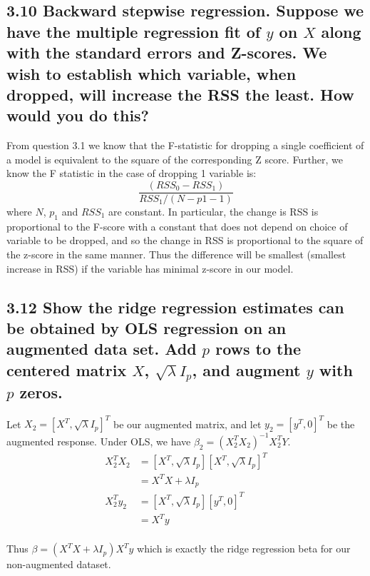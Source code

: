 \subsection*{3.10 Backward stepwise regression. Suppose we have the multiple regression fit of $y$ on $X$ along with the standard errors and Z-scores. We wish to establish which variable, when dropped, will increase the RSS the least. How would you do this?}

From question 3.1 we know that the F-statistic for dropping a single coefficient of a model is equivalent to the square of the corresponding Z score.
Further, we know the F statistic in the case of dropping 1 variable is:
$$ \frac{\left(RSS_0 - RSS_1\right)}{RSS_1 / (N - p1 - 1)}$$
where $N$, $p_1$ and $RSS_1$ are constant. In particular, the change is RSS is proportional to the F-score with a constant that does not depend on choice of variable to be dropped, and so the change in RSS is proportional to the square of the z-score in the same manner. Thus the difference will be smallest (smallest increase in RSS) if the variable has minimal z-score in our model.
\subsection*{3.12 Show the ridge regression estimates can be obtained by OLS regression on an augmented data set. Add $p$ rows to the centered matrix $X$, $\sqrt{\lambda} I_p$, and augment $y$ with $p$ zeros.}

Let $X_2 = [X^T,\sqrt{\lambda} I_p]^T$ be our augmented matrix, and let $y_2 = [y^T,0]^T$ be the augmented response.
Under OLS, we have $\beta_2 = (X_2^T X_2)^{-1} X_2^T Y$.
\begin{align*}
X_2^T X_2 &= [X^T,\sqrt{\lambda} I_p] [X^T,\sqrt{\lambda} I_p]^T \\
&= X^T X + \lambda I_p\\
X_2^T y_2 &= [X^T,\sqrt{\lambda} I_p] [y^T,0]^T \\
&= X^T y\\
\end{align*}

Thus $\beta = \left(X^T X + \lambda I_p\right)X^T y$ which is exactly the ridge regression beta for our non-augmented dataset.
